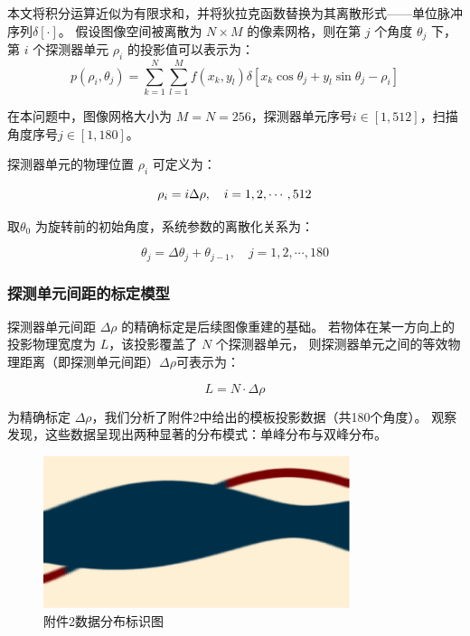 本文将积分运算近似为有限求和，并将狄拉克函数替换为其离散形式——单位脉冲序列$\delta[\cdot]$。
假设图像空间被离散为 $N \times M$ 的像素网格，则在第 $j$ 个角度 $\theta_j$ 下，第 $i$ 个探测器单元 $\rho_i$ 的投影值可以表示为：
$$p(\rho_i,\theta_j)=\sum_{k=1}^{N}\sum_{l=1}^{M}f(x_k,y_l)\delta[x_k\cos\theta_j+y_l\sin\theta_j-\rho_i]$$

在本问题中，图像网格大小为 $M=N=256$，探测器单元序号$i \in [1,512]$，扫描角度序号$j \in [1,180]$。

探测器单元的物理位置 $\rho_i$ 可定义为：

\begin{equation*}
\rho_i = i\Delta\rho, \quad i=1,2,\cdots,512 \\
\end{equation*}

取$\theta_0$ 为旋转前的初始角度，系统参数的离散化关系为：

\begin{equation*}
\theta_j = \Delta\theta_j + \theta_{j-1}, \quad j=1,2,\cdots,180
\end{equation*}



\subsubsection{探测单元间距的标定模型}

探测器单元间距 $\Delta\rho$ 的精确标定是后续图像重建的基础。
若物体在某一方向上的投影物理宽度为 $L$，该投影覆盖了 $N$ 个探测器单元，
则探测器单元之间的等效物理距离（即探测单元间距）$\Delta\rho$可表示为：

$$L = N \cdot \Delta\rho$$

为精确标定 $\Delta\rho$，我们分析了附件2中给出的模板投影数据（共180个角度）。
观察发现，这些数据呈现出两种显著的分布模式：单峰分布与双峰分布。

\begin{figure}[h] 
    \centering 
    \includegraphics[width=0.8\textwidth]{圆形投影分离.png} 
    \caption{附件2数据分布标识图} 
    \label{fig:category}
\end{figure}

